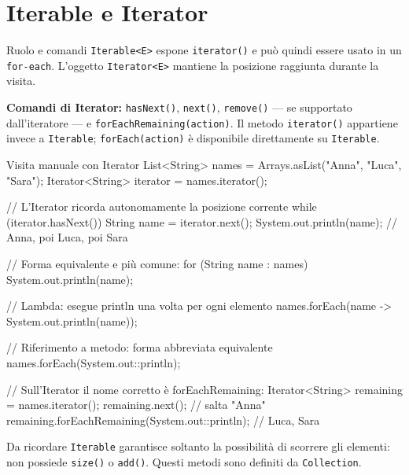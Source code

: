 ﻿\documentclass[10pt,a4paper]{article}
\newcommand{\cmd}[1]{\texttt{#1}}
\newcommand{\topicsection}[1]{\Needspace{12\baselineskip}\section{#1}}
\newenvironment{topicblock}{%
  \par\medskip\noindent\begin{minipage}{\textwidth}%
}{%
  \end{minipage}\par\medskip%
}
\begin{document}
\begin{center}
\end{center}

\begin{topicblock}
\topicsection{Iterable e Iterator}

\begin{concept}{Ruolo e comandi}
\cmd{Iterable<E>} espone \cmd{iterator()} e può quindi essere usato in un
\cmd{for-each}. L'oggetto \cmd{Iterator<E>} mantiene la posizione raggiunta
durante la visita.

\textbf{Comandi di Iterator:} \cmd{hasNext()}, \cmd{next()},
\cmd{remove()} --- se supportato dall'iteratore --- e
\cmd{forEachRemaining(action)}. Il metodo \cmd{iterator()} appartiene invece
a \cmd{Iterable}; \cmd{forEach(action)} è disponibile direttamente su
\cmd{Iterable}.
\end{concept}

\begin{codebox}{Visita manuale con Iterator}
List<String> names = Arrays.asList("Anna", "Luca", "Sara");
Iterator<String> iterator = names.iterator();

// L'Iterator ricorda autonomamente la posizione corrente
while (iterator.hasNext()) {
    String name = iterator.next();
    System.out.println(name); // Anna, poi Luca, poi Sara
}

// Forma equivalente e più comune:
for (String name : names) {
    System.out.println(name);
}

// Lambda: esegue println una volta per ogni elemento
names.forEach(name -> System.out.println(name));

// Riferimento a metodo: forma abbreviata equivalente
names.forEach(System.out::println);

// Sull'Iterator il nome corretto è forEachRemaining:
Iterator<String> remaining = names.iterator();
remaining.next(); // salta "Anna"
remaining.forEachRemaining(System.out::println); // Luca, Sara
\end{codebox}

\begin{difference}{Da ricordare}
\cmd{Iterable} garantisce soltanto la possibilità di scorrere gli elementi:
non possiede \cmd{size()} o \cmd{add()}. Questi metodi sono definiti da
\cmd{Collection}.
\end{difference}

\end{topicblock}
\end{document}
